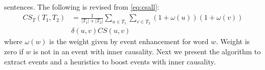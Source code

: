 {sentences. The following is revised from \eqref{eq:csall}:
\begin{align}
CS_T(T_1,T_2)&=\frac{1}{|T_1|+|T_2|}\sum_{u \in T_1}\sum_{v \in T_2}
(1+ \omega(u))(1+ \omega(v))   \nonumber \\
& \delta(u, v) CS(u, v)
\label{eq:csevent}
\end{align}
where $\omega(w)$ is the weight given by event enhancement for word
$w$. Weight is zero if $w$ is not in an event with inner causality.
Next we present the algorithm to extract events and a heuristics to
boost events with inner causality.

}
